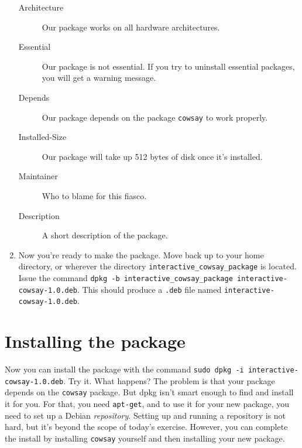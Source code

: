 \documentclass{article}
\begin{document}
\begin{enumerate}
\begin{description}
			\item[Architecture]Our package works on all hardware architectures.

			\item[Essential]Our package is not essential. If you try to uninstall essential packages, you will get a warning message.

			\item[Depends]Our package depends on the package \texttt{cowsay} to work properly.
				
			\item[Installed-Size]Our package will take up 512 bytes of disk once it's installed.

			\item[Maintainer]Who to blame for this fiasco.

			\item[Description]A short description of the package.
		\end{description}
	\item Now you're ready to make the package. Move back up to your home directory, or wherever the directory \texttt{interactive\_cowsay\_package} is located. Issue the command \texttt{dpkg -b interactive\_cowsay\_package interactive-cowsay-1.0.deb}. This should produce a \texttt{.deb} file named \texttt{interactive-cowsay-1.0.deb}.
	\end{enumerate}
	\section{Installing the package}
	Now you can install the package with the command \texttt{sudo dpkg -i interactive-cowsay-1.0.deb}. Try it.
		What happens?
		The problem is that your package depends on the \texttt{cowsay} package. But dpkg isn't smart enough to find and install it for you. For that, you need \texttt{apt-get}, and to use it for your new package, you need to set up a Debian \emph{repository}. Setting up and running a repository is not hard, but it's beyond the scope of today's exercise.  However, you can complete the install by installing \texttt{cowsay} yourself and then installing your new package.
\end{document}
